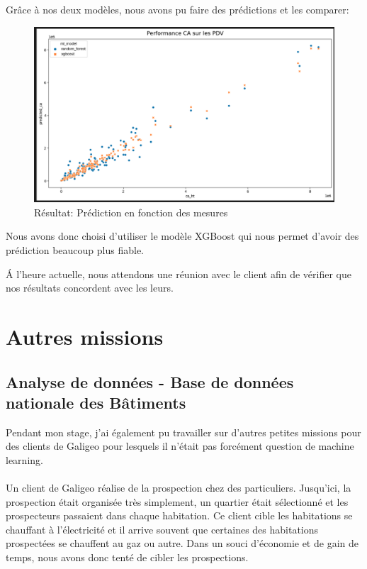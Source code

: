 Grâce à nos deux modèles, nous avons pu faire des prédictions et les comparer:


\begin{figure}[H]
    \centering
    \includegraphics[width=13cm]{images/graphs/result_ca.png}
    \captionsetup{justification=centering}
    \caption{Résultat: Prédiction en fonction des mesures}
    \label{fig:result_ca}
\end{figure}

Nous avons donc choisi d'utiliser le modèle XGBoost qui nous permet d'avoir des prédiction beaucoup plus fiable.

\'A l'heure actuelle, nous attendons une réunion avec le client afin de vérifier que nos résultats concordent avec les leurs.

\section{Autres missions}

\subsection{Analyse de données - Base de données nationale des Bâtiments}

Pendant mon stage, j’ai également pu travailler sur d’autres petites missions pour des clients de Galigeo pour lesquels il n’était pas forcément question de machine learning.

\paragraph{}

Un client de Galigeo réalise de la prospection chez des particuliers. Jusqu’ici, la prospection était organisée très simplement, un quartier était sélectionné et les prospecteurs passaient dans chaque habitation. Ce client cible les habitations se chauffant à l’électricité et il arrive souvent que certaines des habitations prospectées se chauffent au gaz ou autre. Dans un souci d’économie et de gain de temps, nous avons donc tenté de cibler les prospections.

